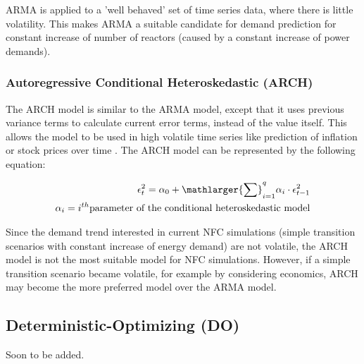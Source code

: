 \gls{ARMA} is applied to a 'well behaved' set of time series data,
where there is little volatility. This makes \gls{ARMA} a suitable
candidate for demand prediction for constant increase of number of
reactors (caused by a constant increase of power demands).


\subsubsection{Autoregressive Conditional Heteroskedastic (ARCH)}
The \gls{ARCH} model is similar to the \gls{ARMA} model, except that
it uses previous variance terms to calculate current error terms, instead
of the value itself. This allows the model to be used in high volatile 
time series like prediction of inflation or stock prices over time \cite{bollerselv_1986}.
The \gls{ARCH} model can be represented by the following equation:

\begin{align}
	\epsilon_t^2 = \alpha_0+{\mathlarger{\sum}}_{i=1}^{q}\alpha_i\cdot\epsilon_{t-1}^2\\
	\alpha_i= i^{th} \mbox{parameter of the conditional heteroskedastic model}
\end{align}

Since the demand trend interested in current \gls{NFC} simulations 
(simple transition scenarios with constant increase of energy demand) are not
volatile, the \gls{ARCH} model is not the most suitable
model for \gls{NFC} simulations. However, if a simple transition
scenario became volatile, for example by considering economics,
\gls{ARCH} may become the more preferred model over the \gls{ARMA} model.




\subsection{Deterministic-Optimizing (DO)}
Soon to be added.





